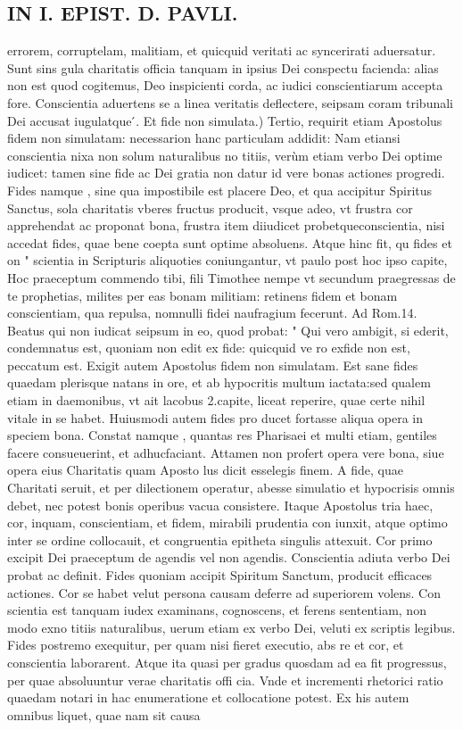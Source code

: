 \documentclass{article}
\begin{document}
\begin{pages}
\section*{IN I. EPIST. D. PAVLI. }
\marginpar{[ p.23 ]}\pstart errorem, corruptelam, malitiam, et quicquid veritati ac syncerirati aduersatur. Sunt sins gula charitatis officia tanquam in ipsius Dei conspectu facienda: alias non est quod cogitemus, Deo inspicienti corda, ac iudici conscientiarum accepta fore. Conscientia aduertens se a linea veritatis deflectere, seipsam coram tribunali Dei accusat iugulatque ́.  \pend\pstart Et fide non simulata.) Tertio, requirit etiam Apostolus fidem non simulatam: necessarion hanc particulam addidit: Nam etiansi conscientia nixa non solum naturalibus no titiis, verùm etiam verbo Dei optime iudicet: tamen sine fide ac Dei gratia non datur id vere bonas actiones progredi. Fides namque , sine qua impostibile est placere Deo, et qua accipitur Spiritus Sanctus, sola charitatis vberes fructus producit, vsque  adeo, vt frustra cor apprehendat ac proponat bona, frustra item diiudicet probetqueconscientia, nisi accedat fides, quae bene coepta sunt optime absoluens. Atque  hinc fit, qu fides et on " scientia in Scripturis aliquoties coniungantur, vt paulo post hoc ipso capite, Hoc praeceptum commendo tibi, fili Timothee nempe vt secundum praegressas de te prophetias, milites per eas bonam militiam: retinens fidem et bonam conscientiam, qua repulsa, nomnulli fidei   naufragium fecerunt. Ad Rom.14. Beatus qui non iudicat seipsum in eo, quod probat: " Qui vero ambigit, si ederit, condemnatus est, quoniam non edit ex fide: quicquid ve   ro exfide non est, peccatum est. Exigit autem Apostolus fidem non simulatam. Est sane fides quaedam plerisque  natans in ore, et ab hypocritis multum iactata:sed qualem etiam in daemonibus, vt ait lacobus 2.capite, liceat reperire, quae certe nihil vitale in se habet. Huiusmodi autem fides pro ducet fortasse aliqua opera in speciem bona. Constat namque , quantas res Pharisaei et multi etiam, gentiles facere consueuerint, et adhucfaciant. Attamen non profert opera vere bona, siue opera eius Charitatis quam Aposto lus dicit esselegis finem. A fide, quae Charitati seruit, et per dilectionem operatur, abesse simulatio et hypocrisis omnis debet, nec potest bonis operibus vacua consistere. Itaque  Apostolus tria haec, cor, inquam, conscientiam, et fidem, mirabili prudentia con iunxit, atque  optimo inter se ordine collocauit, et congruentia epitheta singulis attexuit. Cor primo excipit Dei praeceptum de agendis vel non agendis. Conscientia adiuta verbo Dei probat ac definit. Fides quoniam accipit Spiritum Sanctum, producit efficaces actiones. Cor se habet velut persona causam deferre ad superiorem volens. Con scientia est tanquam iudex examinans, cognoscens, et ferens sententiam, non modo exno titiis naturalibus, uerum etiam ex verbo Dei, veluti ex scriptis legibus. Fides postremo exequitur, per quam nisi fieret executio, abs re et cor, et conscientia laborarent. Atque  ita quasi per gradus quosdam ad ea fit progressus, per quae absoluuntur verae charitatis offi cia. Vnde et incrementi rhetorici ratio quaedam notari in hac enumeratione et collocatione potest. Ex his autem omnibus liquet, quae nam sit causa 
\end{pages}
\end{document}
